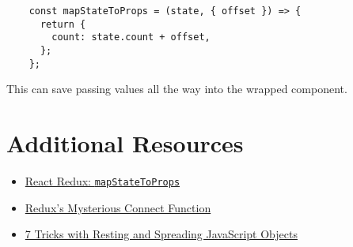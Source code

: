 \begin{verbatim}
    const mapStateToProps = (state, { offset }) => {
      return {
        count: state.count + offset,
      };
    };
\end{verbatim}

This can save passing values all the way into the wrapped component.


\section{Additional Resources}

\begin{itemize}[leftmargin=*]
    \item \href{https://react-redux.js.org/using-react-redux/connect-mapstate}{React Redux: \texttt{mapStateToProps}}
    \item \href{https://medium.com/mofed/reduxs-mysterious-connect-function-526efe1122e4}{Redux’s Mysterious Connect Function}
    \item \href{https://blog.bitsrc.io/6-tricks-with-resting-and-spreading-javascript-objects-68d585bdc83}{7 Tricks with Resting and Spreading JavaScript Objects}
\end{itemize}
